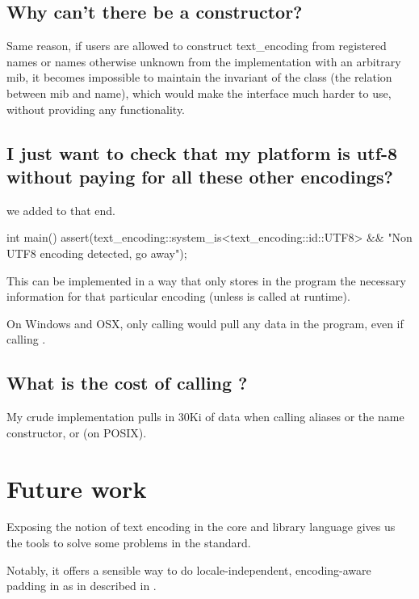 \documentclass{wg21}
\begin{document}
\subsection{Why can't there be a  constructor?}

Same reason, if users are allowed to construct text_encoding from registered names or names otherwise
unknown from the implementation with an arbitrary mib, it becomes impossible to maintain the invariant of the class
(the relation between mib and name), which would make the interface much harder to use, without providing
any functionality.

\subsection{I just want to check that my platform is utf-8 without paying for all these other encodings?}

we added  to that end.

\begin{colorblock}[style=MY]
    int main() {
        assert(text_encoding::system_is<text_encoding::id::UTF8>
                  && "Non UTF8 encoding detected, go away");
    }
\end{colorblock}


This can be implemented in a way that only stores in the program the necessary information for that particular encoding (unless  is called at runtime).

On Windows and OSX, only calling  would pull any data in the program, even if calling .


\subsection{What is the cost of calling ?}

My crude implementation pulls in 30Ki of data when calling aliases or the name constructor, or  (on POSIX).
\section{Future work}

Exposing the notion of text encoding in the core and library language gives us the tools to solve some
problems in the standard.

Notably, it offers a sensible way to do locale-independent, encoding-aware padding in  as in described in \cite{P1868}.
\end{document}
